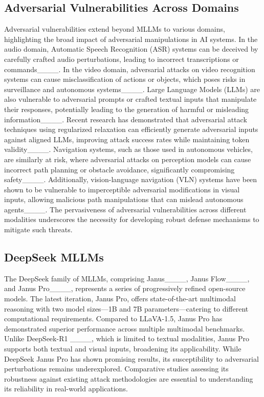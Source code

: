 \subsection{Adversarial Vulnerabilities Across Domains}
Adversarial vulnerabilities extend beyond MLLMs to various domains, highlighting the broad impact of adversarial manipulations in AI systems. In the audio domain, Automatic Speech Recognition (ASR) systems can be deceived by carefully crafted audio perturbations, leading to incorrect transcriptions or commands____. In the video domain, adversarial attacks on video recognition systems can cause misclassification of actions or objects, which poses risks in surveillance and autonomous systems____. Large Language Models (LLMs) are also vulnerable to adversarial prompts or crafted textual inputs that manipulate their responses, potentially leading to the generation of harmful or misleading information____. Recent research has demonstrated that adversarial attack techniques using regularized relaxation can efficiently generate adversarial inputs against aligned LLMs, improving attack success rates while maintaining token validity____. Navigation systems, such as those used in autonomous vehicles, are similarly at risk, where adversarial attacks on perception models can cause incorrect path planning or obstacle avoidance, significantly compromising safety____. Additionally, vision-language navigation (VLN) systems have been shown to be vulnerable to imperceptible adversarial modifications in visual inputs, allowing malicious path manipulations that can mislead autonomous agents____. The pervasiveness of adversarial vulnerabilities across different modalities underscores the necessity for developing robust defense mechanisms to mitigate such threats.


\subsection{DeepSeek MLLMs}
The DeepSeek family of MLLMs, comprising Janus____, Janus Flow____, and Janus Pro____, represents a series of progressively refined open-source models. The latest iteration, Janus Pro, offers state-of-the-art multimodal reasoning with two model sizes—1B and 7B parameters—catering to different computational requirements. Compared to LLaVA-1.5, Janus Pro has demonstrated superior performance across multiple multimodal benchmarks. Unlike DeepSeek-R1 ____, which is limited to textual modalities, Janus Pro supports both textual and visual inputs, broadening its applicability. While DeepSeek Janus Pro has shown promising results, its susceptibility to adversarial perturbations remains underexplored. Comparative studies assessing its robustness against existing attack methodologies are essential to understanding its reliability in real-world applications.